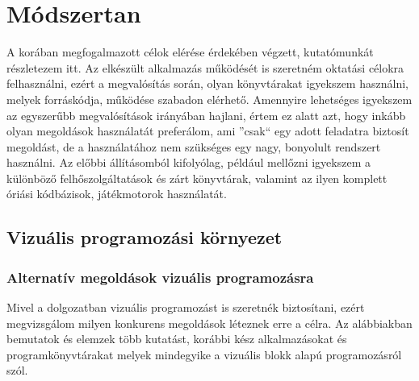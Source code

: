 \documentclass[12pt,a4paper,oneside]{report} %
\begin{document}

\chapter{Módszertan}
\label{modtan}
A korában megfogalmazott célok elérése érdekében végzett, kutatómunkát részletezem itt.
Az elkészült alkalmazás működését is szeretném oktatási célokra felhasználni, ezért a megvalósítás során, olyan könyvtárakat igyekszem használni,  melyek forráskódja, működése szabadon elérhető. Amennyire lehetséges igyekszem az egyszerűbb megvalósítások irányában hajlani, értem ez alatt azt, hogy inkább olyan megoldások használatát preferálom, ami ''csak`` egy adott feladatra biztosít megoldást, de a használatához nem szükséges egy nagy, bonyolult rendszert használni. Az előbbi állításomból kifolyólag, például mellőzni igyekszem a különböző felhőszolgáltatások és zárt könyvtárak, valamint az ilyen komplett óriási kódbázisok, játékmotorok használatát.
\section{Vizuális programozási környezet}
\subsection{Alternatív megoldások vizuális programozásra}
\label{vizuprogkor}
Mivel a dolgozatban vizuális  programozást  is szeretnék biztosítani, ezért megvizsgálom milyen konkurens megoldások léteznek erre a célra. Az alábbiakban bemutatok és elemzek több kutatást, korábbi kész alkalmazásokat és programkönyvtárakat melyek mindegyike a vizuális blokk alapú programozásról szól.
\end{document}
